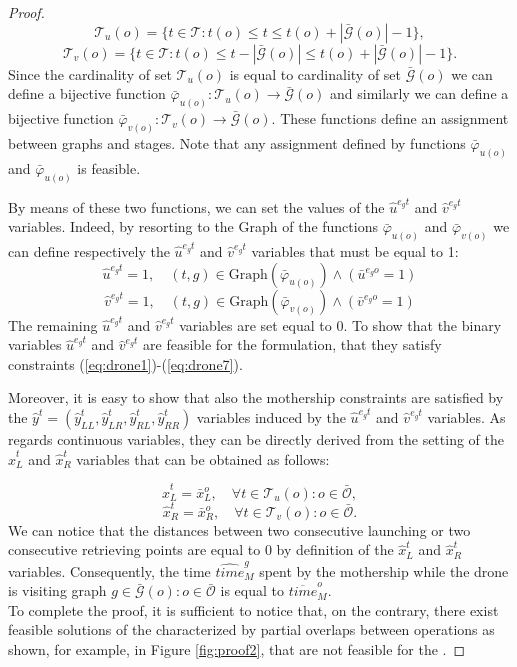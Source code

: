 {\begin{proof}
$$
\mathcal T_u(o)= \{ t \in \mathcal T: t(o) \leq t \leq t(o) + |\mathcal{\bar{G}}(o)| - 1 \},
$$
$$
\mathcal T_v(o)= \{ t \in \mathcal T: t(o) \leq t - |\mathcal {\bar{G}}(o)| \leq t(o) + |\mathcal {\bar{G}}(o)| - 1 \}.
$$
\noindent
Since the cardinality of set $\mathcal T_u(o)$ is equal to cardinality of set $\mathcal{\bar{G}}(o)$ we can define a bijective function $\bar\varphi_{u(o)}:\mathcal T_u(o) \rightarrow \mathcal{\bar{G}}(o)$ and similarly we can define a bijective function $\bar\varphi_{v(o)}:\mathcal T_v(o) \rightarrow \mathcal{\bar{G}}(o)$. These functions define an assignment between graphs and stages. Note that any assignment defined by functions $\bar\varphi_{u(o)}$ and $\bar\varphi_{u(o)}$ is feasible.

By means of these two functions, we can set the values of the $\hat{u}^{e_gt}$ and $\hat{v}^{e_gt}$ variables. Indeed, by resorting to the Graph of the functions $\bar\varphi_{u(o)}$ and $\bar\varphi_{v(o)}$ we can define respectively the $\hat{u}^{e_gt}$ and $\hat{v}^{e_gt}$ variables that must be equal to 1:
$$
\hat{u}^{e_gt} = 1, \quad (t,g) \in \mbox{Graph}(\bar\varphi_{u(o)}) \wedge (\bar{u}^{e_go}=1) %
$$
$$
\hat{v}^{e_gt} = 1, \quad (t,g) \in \mbox{Graph}(\bar\varphi_{v(o)})  \wedge (\bar{v}^{e_go}=1) %
$$
The remaining $\hat{u}^{e_gt}$ and $\hat{v}^{e_gt}$ variables are set equal to 0.
To show that the binary variables $\hat{u}^{e_gt}$ and $\hat{v}^{e_gt}$ are feasible for the \AMDPO\xspace formulation,  that they satisfy constraints (\ref{eq:drone1})-(\ref{eq:drone7}).

\noindent
Moreover, it is easy to show that also the mothership constraints are satisfied by the $\hat y^t=(\hat y_{LL}^t, \hat y_{LR}^t, \hat y_{RL}^t, \hat y_{RR}^t)$ variables induced by the $\hat{u}^{e_gt}$ and $\hat{v}^{e_gt}$ variables. 
\noindent
As regards continuous variables, they can be directly derived from the setting of the $\hat x_L^t$ and $\hat x_R^t$ variables that can be obtained as follows:

$$
\hat x_L^t=\bar x_L^o,\quad \forall t \in \mathcal T_u(o) : o \in \bar{\mathcal O},
$$
$$
\hat x_R^t=\bar x_R^o, \quad \forall t \in \mathcal T_v(o) : o \in \bar{\mathcal O}.
$$
\noindent
We can notice that the distances between two consecutive launching or two consecutive retrieving points are equal to 0 by definition of the $\hat x_L^t$ and $\hat x_R^t$ variables.
Consequently, the time $\widehat{time}_M^g$ spent by the mothership while the drone is visiting graph $g \in \mathcal {\bar{G}}(o): o \in \bar{\mathcal O}$ is equal to $\overline{time}_M^o$.\\
To complete the proof, it is sufficient to notice that, on the contrary, there exist feasible solutions of the \AMDPO\xspace characterized by partial overlaps between operations as shown, for example, in Figure \ref{fig:proof2}, that are not feasible for the \AMDCO.
\end{proof}


}
